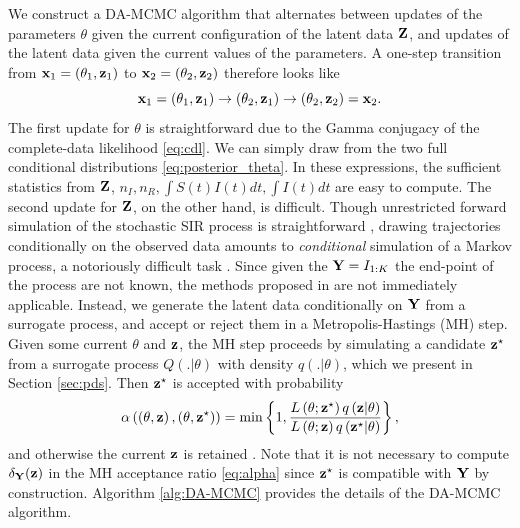 \documentclass[11pt]{article}
\begin{document}
	We construct a DA-MCMC algorithm that alternates between updates of the parameters $\theta$ given the current configuration of the latent data $\mathbf{Z}$, and updates of the latent data given the current values of the parameters. A one-step transition from $\mathbf{x}_1 = (\theta_1, \mathbf{z}_1)$ to $\mathbf{x}_2 = (\theta_2, \mathbf{z}_2)$ therefore looks like
	$$\mathbf{x}_1 = (\theta_1, \mathbf{z}_1) \rightarrow (\theta_2, \mathbf{z}_1) \rightarrow (\theta_2, \mathbf{z}_2) = \mathbf{x}_2.$$
	The first update for $\theta$ is straightforward due to the Gamma conjugacy of the complete-data likelihood \eqref{eq:cdl}. We can simply draw from the two full conditional distributions \eqref{eq:posterior_theta}. In these expressions, the sufficient statistics from $\mathbf{Z}$, $n_I, n_R, \int S(t)I(t) dt, \int I(t) dt$ are easy to compute.
	The second update for $\mathbf{Z}$, on the other hand, is difficult. Though unrestricted forward simulation of the stochastic SIR process is straightforward \cite{Gillespie.1977}, drawing trajectories conditionally on the observed data amounts to \textit{conditional} simulation of a Markov process, a notoriously difficult task \cite{Hobolth.2009}. Since given the $\mathbf{Y} = I_{1:K}$ the end-point of the process are not known, the methods proposed in \cite{Hobolth.2009} are not immediately applicable.
	Instead, we generate the latent data conditionally on $\mathbf{Y}$ from a surrogate process, and accept or reject them in a Metropolis-Hastings (MH) step. Given some current $\theta$ and $\mathbf{z}$, the MH step proceeds by simulating a candidate $\mathbf{z}^\star$ from a surrogate process $Q(.|\theta)$ with density $q(.|\theta)$, which we present in Section \eqref{sec:pds}. Then $\mathbf{z}^\star$ is accepted with probability
	\begin{equation}
		\label{eq:alpha}
		\alpha\left( \left( \theta, \mathbf{z}\right) , \left( \theta, \mathbf{z}^\star\right) \right) =	\min\left\lbrace 1, \dfrac{L\left( \theta; \mathbf{z}^\star\right) q\left( \mathbf{z}|\theta\right)}{L\left( \theta;\mathbf{z}\right) q\left( \mathbf{z}^\star|\theta\right)}\right\rbrace,
	\end{equation}
	and otherwise the current $\mathbf{z}$ is retained \cite{Tierney.1994}. Note that it is not necessary to compute $\delta_{\mathbf{Y}}(\mathbf{z})$ in the MH acceptance ratio \eqref{eq:alpha} since $\mathbf{z}^\star$ is compatible with $\mathbf{Y}$ by construction. Algorithm \ref{alg:DA-MCMC} provides the details of the DA-MCMC algorithm.
	
\end{document}

